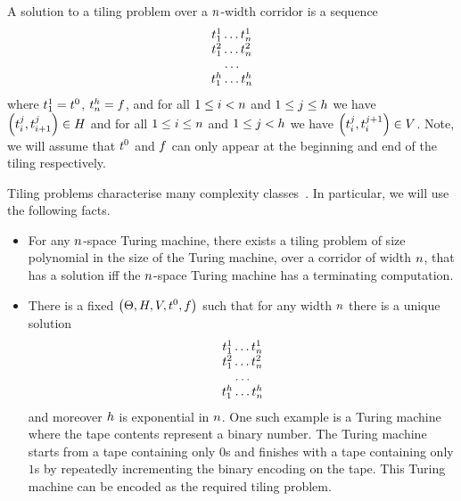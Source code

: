 A solution to a tiling problem over a $n$-width corridor is a sequence
\[
    \begin{array}{c}
        t^1_1 \ldots t^1_n \\
        t^2_1 \ldots t^2_n \\
        \ldots \\
        t^h_1 \ldots t^h_n
    \end{array}
\]
where
$t^1_1 = t^0$,
$t^h_n = f$,
and for all
$1 \leq i < n$
and
$1 \leq j \leq h$
we have
$\left( t^j_i, t^j_{i+1} \right) \in H$
and for all
$1 \leq i \leq n$
and
$1 \leq j < h$
we have
$\left( t^j_i, t^{j+1}_i \right) \in V$.
Note, we will assume that $t^0$ and $f$ can only appear at
the beginning and end of the tiling respectively.

Tiling problems characterise many complexity classes~\cite{BGG97}. In
particular, we will use the following facts.

\begin{itemize}
\item
    For any $n$-space Turing machine, there exists a tiling problem
    of size polynomial in the size of the Turing machine, over a corridor
    of width $n$, that has a solution iff the $n$-space Turing
    machine has a terminating computation.

\item
    There is a fixed
    $\left( \Theta, H, V, t^0, f \right)$
    such that for any width $n$ there is a unique solution
    \[
      \begin{array}{c}
          t^1_1 \ldots t^1_n \\
          t^2_1 \ldots t^2_n \\
          \ldots \\
          t^h_1 \ldots t^h_n
      \end{array}
    \]
    and moreover $h$ is exponential in $n$. One such
    example is a Turing machine where the tape contents represent a binary
    number. The Turing machine starts from a tape containing only $0$s
    and finishes with a tape containing only $1$s by repeatedly
    incrementing the binary encoding on the tape. This Turing machine can
    be encoded as the required tiling problem.
\end{itemize}

